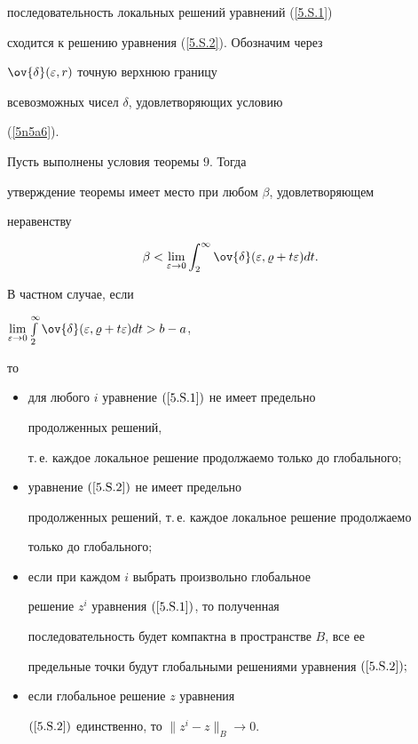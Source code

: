 последовательность локальных решений уравнений (\ref{5.S.1})


сходится к решению уравнения (\ref{5.S.2}). Обозначим через


$\ov{\delta}(\varepsilon,r)$ точную верхнюю границу


всевозможных чисел $\delta$, удовлетворяющих условию


(\ref{5n5a6}).








\begin{thm}


Пусть выполнены условия теоремы $9$. Тогда


утверждение теоремы имеет место при любом $\beta$, удовлетворяющем


неравенству


\begin{equation}\label{5na108}


\beta<\lim_{\varepsilon\to 0}


\int_2^\infty \ov{\delta} (\varepsilon, \varrho+t


\varepsilon) d t.


\end{equation}


В частном случае, если


$\lim\limits_{\varepsilon\to 0}\int\limits_2^\infty \ov{\delta}


(\varepsilon, \varrho+t \varepsilon) d t > b-a$,


то


\begin{itemize}


\item[1)] для любого $i$ уравнение $(\ref{5.S.1})$ не имеет предельно 


продолженных решений,


т.\,е. каждое локальное решение продолжаемо только до глобального\/$;$


\item[2)] уравнение $(\ref{5.S.2})$ не имеет предельно


продолженных решений, т.\,е. каждое локальное решение продолжаемо


только до глобального\/$;$


\item[3)] если при каждом $i$ выбрать произвольно глобальное


решение $z^i$ уравнения $(\ref{5.S.1})$, то полученная


последовательность будет компактна в пространстве $B$, все ее


предельные точки будут глобальными решениями уравнения $(\ref{5.S.2});$


\item[4)] если глобальное решение $z$ уравнения


$(\ref{5.S.2})$ единственно, то $\|z^i - z\|_{B} \to 0$.


\end{itemize}


\end{thm}
